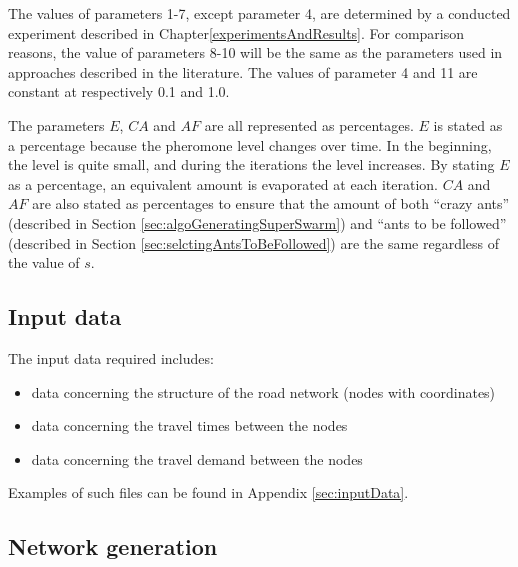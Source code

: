 The values of parameters 1-7, except parameter 4, are determined by a conducted experiment described in Chapter\vref{experimentsAndResults}. For comparison reasons, the value of parameters 8-10 will be the same as the parameters used in approaches described in the literature\citep{mandl79, kechagiopoulos14, nikolic14,kidwai98,fan10,chakroborty02,zhang10,chew12,baaj91, mumford13}. The values of parameter 4 and 11 are constant at respectively 0.1 and 1.0.

The parameters $E$, $CA$ and $AF$ are all represented as percentages. $E$ is stated as a percentage because the pheromone level changes over time. In the beginning, the level is quite small, and during the iterations the level increases. By stating $E$ as a percentage, an equivalent amount is evaporated at each iteration. $CA$ and $AF$ are also stated as percentages to ensure that the amount of both ``crazy ants'' (described in Section \vref{sec:algoGeneratingSuperSwarm}) and ``ants to be followed'' (described in Section \vref{sec:selctingAntsToBeFollowed}) are the same regardless of the value of $s$. 


\subsection{Input data}
The input data required includes:
\begin{itemize}
\item data concerning the structure of the road network (nodes with coordinates)
\item data concerning the travel times between the nodes
\item data concerning the travel demand between the nodes
\end{itemize}
Examples of such files can be found in Appendix \vref{sec:inputData}.

\subsection{Network generation}
\label{subsec:networkGeneration}

